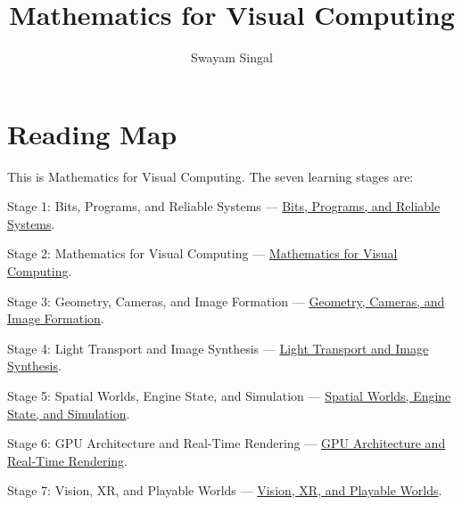 \documentclass[11pt,twoside,openany]{book}
\title{Mathematics for Visual Computing}
\author{Swayam Singal}
\begin{document}
\maketitle
\begin{center}\end{center}
\hypertarget{volume-reading-map}{}
\chapter*{Reading Map}
\noindent This is Mathematics for Visual Computing. The seven learning stages are:
\par\noindent Stage 1: Bits, Programs, and Reliable Systems --- \href{../01-Bits-Programs-and-Reliable-Systems/main.pdf}{Bits, Programs, and Reliable Systems}.
\par\noindent Stage 2: Mathematics for Visual Computing --- \href{../02-Mathematics-for-Visual-Computing/main.pdf}{Mathematics for Visual Computing}.
\par\noindent Stage 3: Geometry, Cameras, and Image Formation --- \href{../03-Geometry-Cameras-and-Image-Formation/main.pdf}{Geometry, Cameras, and Image Formation}.
\par\noindent Stage 4: Light Transport and Image Synthesis --- \href{../04-Light-Transport-and-Image-Synthesis/main.pdf}{Light Transport and Image Synthesis}.
\par\noindent Stage 5: Spatial Worlds, Engine State, and Simulation --- \href{../05-Spatial-Worlds-Engine-State-and-Simulation/main.pdf}{Spatial Worlds, Engine State, and Simulation}.
\par\noindent Stage 6: GPU Architecture and Real-Time Rendering --- \href{../06-GPU-Architecture-and-Real-Time-Rendering/main.pdf}{GPU Architecture and Real-Time Rendering}.
\par\noindent Stage 7: Vision, XR, and Playable Worlds --- \href{../07-Vision-XR-and-Playable-Worlds/main.pdf}{Vision, XR, and Playable Worlds}.
\tableofcontents
\mainmatter
\setcounter{chapter}{0}






\end{document}
